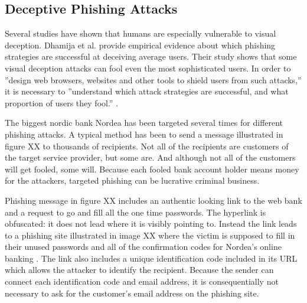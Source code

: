 \documentclass{tktltiki}
\begin{document}
\subsection{Deceptive Phishing Attacks}

    Several studies have shown \cite{visual_similarity_phishing_2008, why_phishing_works_06, suspectibility_to_phishing_2006} that humans are especially vulnerable to visual deception. Dhamija et al. \cite{why_phishing_works_06} provide empirical evidence about which phishing strategies are successful at deceiving average users. Their study shows that some visual deception attacks can fool even the most sophisticated users. In order to ''design web browsers, websites and other tools to shield users from such attacks,'' it is necessary to ''understand which attack strategies are successful, and what proportion of users they fool.'' \cite{why_phishing_works_06}
.

    The biggest nordic bank Nordea has been targeted several times for different phishing attacks. A typical method has been to send a message illustrated in figure XX to thousands of recipients. Not all of the recipients are customers of the target service provider, but some are. And although not all of the customers will get fooled, some will. Because each fooled bank account holder means money for the attackers, targeted phishing can be lucrative criminal business.

      Phishing message in figure XX includes an authentic looking link to the web bank and a request to go and fill all the one time passwords. The hyperlink is obfuscated: it does not lead where it is visibly pointing to. Instead the link leads to a phishing site illustrated in image XX where the victim is supposed to fill in their unused passwords and all of the confirmation codes for Nordea's online banking \cite{nordea_fsecure_2006, nordea_miller_2006}. The link also includes a unique identification code included in its URL which allows the attacker to identify the recipient. Because the sender can connect each identification code and email address, it is consequentially not necessary to ask for the customer's email address on the phishing site.
      
          
%   
% 
%   
\end{document}
